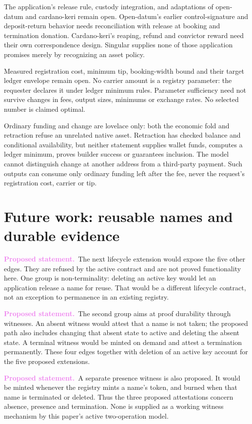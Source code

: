 \documentclass[runningheads]{llncs}
\newcommand{\proposed}{\par\noindent\textcolor{violet}{\textbf{Proposed statement.}}\ }
\begin{document}
The application's release rule, custody integration, and adaptations of
open-datum and cardano-keri remain open. Open-datum's earlier control-signature
and deposit-return behavior needs reconciliation with release at booking and
termination donation. Cardano-keri's reaping, refund and convictor reward need
their own correspondence design. Singular supplies none of those application
promises merely by recognizing an asset policy.

Measured registration cost, minimum tip, booking-width bound and their target
ledger envelope remain open. No carrier amount is a registry parameter:
the requester declares it under ledger minimum rules. Parameter sufficiency
need not survive changes in fees, output sizes, minimums or exchange rates.
No selected number is claimed optimal.

Ordinary funding and change are lovelace only: both the economic fold and
retraction refuse an unrelated native asset. Retraction has checked balance
and conditional availability, but neither statement supplies wallet funds,
computes a ledger minimum, proves builder success or guarantees inclusion.
The model cannot distinguish change at another address from a third-party
payment. Such outputs can consume only ordinary funding left after the fee,
never the request's registration cost, carrier or tip.



\section{Future work: reusable names and durable evidence}
\proposed The next lifecycle extension would expose the five other edges.
They are refused by the active contract and are not proved functionality
here. One group is non-terminality: deleting an active key would let an
application release a name for reuse. That would be a different lifecycle
contract, not an exception to permanence in an existing registry.

\proposed The second group aims at proof durability through witnesses.
An absent witness would attest that a name is not taken; the proposed path
also includes changing that absent state to active and deleting the absent
state. A terminal witness would be minted on demand and attest a termination
permanently. These four edges together with deletion of an active key account
for the five proposed extensions.

\proposed A separate presence witness is also proposed. It would be minted
whenever the registry mints a name's token, and burned when that name is
terminated or deleted. Thus the three proposed attestations concern absence,
presence and termination. None is supplied as a working witness mechanism
by this paper's active two-operation model.
\end{document}

